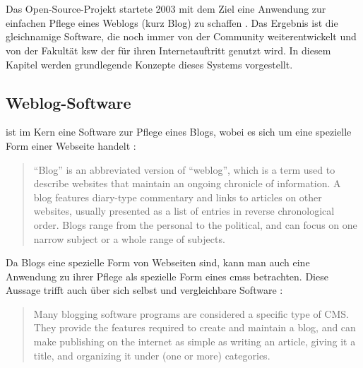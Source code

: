 \section{\wordpress}
    \label{section:WordPress}
    Das Open-Source-Projekt {\wordpress} startete 2003
    mit dem Ziel eine Anwendung zur einfachen Pflege eines Weblogs
    (kurz Blog) zu schaffen \cite{wordpress:About}.
    Das Ergebnis ist die gleichnamige Software,
    die noch immer von der Community weiterentwickelt
    und von der Fakultät \gls{ksw} der {\fernUni} für ihren
    Internetauftritt genutzt wird.
    In diesem Kapitel werden grundlegende Konzepte dieses Systems vorgestellt.

    \subsection{Weblog-Software}
        \label{section:weblogSoftware}
        {\wordpress} ist im Kern eine Software zur Pflege eines Blogs,
        wobei es sich um eine spezielle Form einer Webseite handelt
        \cite[Kapitel "`Introduction to Blogging"']{wordpress:codex}:

        \begin{quote}
            "`Blog"' is an abbreviated version of "`weblog"',
            which is a term used to describe websites that maintain
            an ongoing chronicle of information.
            A blog features diary-type commentary and links to articles
            on other websites, usually presented as a list of entries in
            reverse chronological order.
            Blogs range from the personal to the political,
            and can focus on one narrow subject or a whole range of subjects.
        \end{quote}

        Da Blogs eine spezielle Form von Webseiten sind,
        kann man auch eine Anwendung zu ihrer Pflege als
        spezielle Form eines \glspl{cms} betrachten.
        Diese Aussage trifft {\wordpress} auch über sich selbst
        und vergleichbare Software \cite[Kapitel "`Introduction to Blogging"']{wordpress:codex}:

        \begin{quote}
            Many blogging software programs are considered a specific type of CMS.
            They provide the features required to create and maintain a blog,
            and can make publishing on the internet as simple as writing an article,
            giving it a title, and organizing it under (one or more) categories.
        \end{quote}

